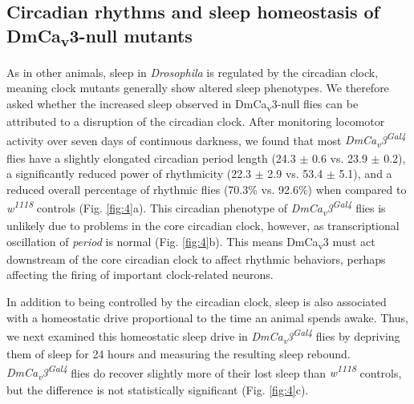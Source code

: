 \subsection*{Circadian rhythms and sleep homeostasis of DmCa\textsubscript{v}3-null mutants}

As in other animals, sleep in \emph{Drosophila} is regulated by the circadian clock, meaning clock mutants generally show altered sleep phenotypes\cite{hendricks:2003aa, parisky:2008aa}.
We therefore asked whether the increased sleep observed in DmCa\textsubscript{v}3-null flies can be attributed to a disruption of the circadian clock.
After monitoring locomotor activity over seven days of continuous darkness, we found that most \emph{DmCa\textsubscript{v}3\textsuperscript{Gal4}} flies have a slightly elongated circadian period length (24.3 $\pm$ 0.6 vs. 23.9 $\pm$ 0.2), a significantly reduced power of rhythmicity (22.3 $\pm$ 2.9 vs. 53.4 $\pm$ 5.1), and a reduced overall percentage of rhythmic flies (70.3\% vs. 92.6\%) when compared to \emph{w\textsuperscript{1118}} controls (Fig. \ref{fig:4}a).
This circadian phenotype of \emph{DmCa\textsubscript{v}3\textsuperscript{Gal4}} flies is unlikely due to problems in the core circadian clock, however, as transcriptional oscillation of \emph{period} is normal (Fig. \ref{fig:4}b).
This means DmCa\textsubscript{v}3 must act downstream of the core circadian clock to affect rhythmic behaviors, perhaps affecting the firing of important clock-related neurons.

In addition to being controlled by the circadian clock, sleep is also associated with a homeostatic drive proportional to the time an animal spends awake. Thus, we next examined this homeostatic sleep drive in \emph{DmCa\textsubscript{v}3\textsuperscript{Gal4}} flies by depriving them of sleep for 24 hours and measuring the resulting sleep rebound. \emph{DmCa\textsubscript{v}3\textsuperscript{Gal4}} flies do recover slightly more of their lost sleep than \emph{w\textsuperscript{1118}} controls, but the difference is not statistically significant (Fig. \ref{fig:4}c).
